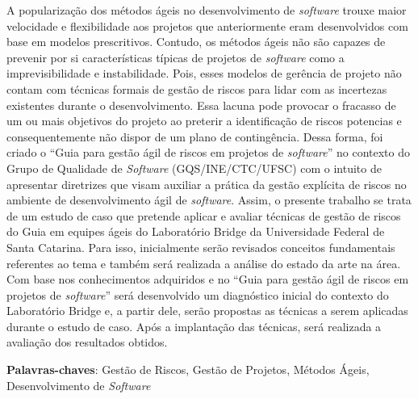 \documentclass[
    12pt,       %
    openright,      %
    twoside,      %
    a4paper,      %
    english,      %
    french,       %
    spanish,      %
    brazil,       %
    ]{abntex2}
\begin{document}
  \begin{resumo}
    A popularização dos métodos ágeis no desenvolvimento de \textit{\textit{software}} trouxe maior velocidade e flexibilidade aos projetos que anteriormente eram desenvolvidos com base em modelos prescritivos. Contudo, os métodos ágeis não são capazes de prevenir por si características típicas de projetos de \textit{software} como a imprevisibilidade e instabilidade. Pois, esses modelos de gerência de projeto não contam com técnicas formais de gestão de riscos para lidar com as incertezas existentes durante o desenvolvimento. Essa lacuna pode provocar o fracasso de um ou mais objetivos do projeto ao preterir a identificação de riscos potencias e consequentemente não dispor de um plano de contingência. Dessa forma, foi criado o “Guia para gestão ágil de riscos em projetos de \textit{software}” no contexto do Grupo de Qualidade de \textit{Software} (GQS/INE/CTC/UFSC) com o intuito de apresentar diretrizes que visam auxiliar a prática da gestão explícita de riscos no ambiente de desenvolvimento ágil de \textit{software}. Assim, o presente trabalho se trata de um estudo de caso que pretende aplicar e avaliar técnicas de gestão de riscos do Guia em equipes ágeis do Laboratório Bridge da Universidade Federal de Santa Catarina. Para isso, inicialmente serão revisados conceitos fundamentais referentes ao tema e também será realizada a análise do estado da arte na área. Com base nos conhecimentos adquiridos e no “Guia para gestão ágil de riscos em projetos de \textit{software}” será desenvolvido um diagnóstico inicial do contexto do Laboratório Bridge e, a partir dele, serão propostas as técnicas a serem aplicadas durante o estudo de caso. Após a implantação das técnicas, será realizada a avaliação dos resultados obtidos.
   \vspace{\onelineskip}

   \noindent
   \textbf{Palavras-chaves}: Gestão de Riscos, Gestão de Projetos, Métodos Ágeis, Desenvolvimento de \textit{Software}
  \end{resumo}
\end{document}
